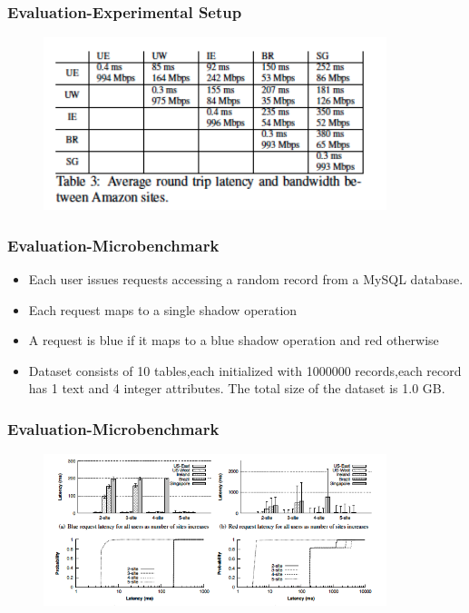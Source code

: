 \documentclass{beamer}
\begin{document}

\begin{frame}
\frametitle{Evaluation-Experimental Setup}
\begin{figure}[t]
\includegraphics[width=10cm]{pic14.jpg}
\centering
\end{figure}
\end{frame}



\begin{frame}
\frametitle{Evaluation-Microbenchmark}
\begin{itemize}
\item Each user issues requests accessing a random record from a MySQL database.
\item Each request maps to a single shadow operation
\item A request is blue if it maps to a blue shadow operation and red otherwise
\item Dataset consists of 10 tables,each initialized with 1000000 records,each record has 1 text and 4 integer attributes. The total size of the dataset is 1.0 GB.
\end{itemize}
\end{frame}



\begin{frame}
\frametitle{Evaluation-Microbenchmark}
\begin{figure}[t]
\includegraphics[width=10cm]{pic15.jpg}
\centering
\end{figure}
\end{frame}
\end{document}
